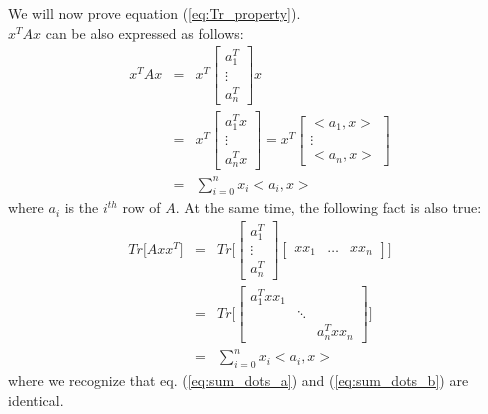 \documentclass{article}
\begin{document}
We will now prove equation (\ref{eq:Tr_property}).
\\
$x^T A x$ can be also expressed as follows:
\begin{eqnarray}
x^T A x &=& x^T \begin{bmatrix} 
a_1^T \\
\vdots \\ 
a_n^T
\end{bmatrix} x \\
&=&
x^T \begin{bmatrix} 
a_1^T x \\
\vdots \\ 
a_n^T x
\end{bmatrix} = x^T \begin{bmatrix} 
<a_1, x> \\
\vdots \\ 
<a_n, x>
\end{bmatrix} \\
&=&
\sum_{i = 0}^n x_i <a_i, x>
\label{eq:sum_dots_a}
\end{eqnarray}
where $a_i$ is the $i^{th}$ row of $A$.
At the same time, the following fact is also true:
\begin{eqnarray}
Tr \bigg [ A x x^T \bigg ] &=& 
Tr \bigg [
\begin{bmatrix} a_1^T \\ \vdots \\ a_n^T \end{bmatrix}
\begin{bmatrix} xx_1 & \hdots & xx_n \end{bmatrix}
\bigg ]  \\
&=&
Tr \bigg [
\begin{bmatrix} 
a_1^T xx_1 & & \\
& \ddots & \\
& & a_n^T xx_n
\end{bmatrix}
\bigg ] \\
&=&
\sum_{i = 0}^n x_i <a_i, x>
\label{eq:sum_dots_b}
\end{eqnarray}
where we recognize that eq. (\ref{eq:sum_dots_a}) and (\ref{eq:sum_dots_b}) are identical.
\end{document}
